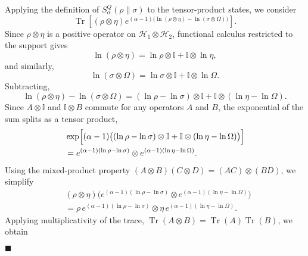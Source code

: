 \documentclass[a4paper, amsfonts, amssymb, amsmath, reprint, showkeys, nofootinbib, twoside, aps, pra]{revtex4-2}
\theoremstyle{definition}
\renewenvironment{proof}{\noindent{\bfseries Proof.}}{\hfill$\blacksquare$}
\begin{document}
\begin{proof}
Applying the definition of $S^Q_\alpha(\rho \| \sigma)$ to the tensor-product states, we consider
\begin{equation}
\operatorname{Tr}\!\left[
(\rho \otimes \eta)
e^{(\alpha-1)\bigl(\ln(\rho \otimes \eta)-\ln(\sigma \otimes \Omega)\bigr)}
\right].
\end{equation}
Since $\rho \otimes \eta$ is a positive operator on 
$\mathcal{H}_1 \otimes \mathcal{H}_2$, functional calculus restricted 
to the support gives
\begin{equation}
\ln(\rho \otimes \eta)
=
\ln\rho \otimes \mathbb{I}
+
\mathbb{I} \otimes \ln\eta,
\end{equation}
and similarly,
\begin{equation}
\ln(\sigma \otimes \Omega)
=
\ln\sigma \otimes \mathbb{I}
+
\mathbb{I} \otimes \ln\Omega.
\end{equation}
Subtracting,
\begin{equation}
\ln(\rho \otimes \eta)
-
\ln(\sigma \otimes \Omega)
=
(\ln\rho-\ln\sigma)\otimes \mathbb{I}
+
\mathbb{I}\otimes(\ln\eta-\ln\Omega).
\end{equation}
Since $A \otimes \mathbb{I}$ and $\mathbb{I} \otimes B$ commute for any 
operators $A$ and $B$, the exponential of the sum splits as a tensor product,
\begin{equation}
\begin{aligned}
&\exp\Bigl[ (\alpha-1)\bigl( (\ln\rho-\ln\sigma)\otimes \mathbb{I} + \mathbb{I}\otimes(\ln\eta-\ln\Omega) \bigr) \Bigr] \\
&= e^{(\alpha-1)(\ln\rho-\ln\sigma)} \otimes e^{(\alpha-1)(\ln\eta-\ln\Omega)}.
\end{aligned}
\end{equation}
Using the mixed-product property 
$(A \otimes B)(C \otimes D) = (AC) \otimes (BD)$,
we simplify
\begin{equation}
\begin{aligned}
&(\rho \otimes \eta) \bigl( e^{(\alpha-1)(\ln\rho-\ln\sigma)} \otimes e^{(\alpha-1)(\ln\eta-\ln\Omega)} \bigr) \\
&= \rho\,e^{(\alpha-1)(\ln\rho-\ln\sigma)} \otimes \eta\,e^{(\alpha-1)(\ln\eta-\ln\Omega)}.
\end{aligned}
\end{equation}
Applying multiplicativity of the trace, 
$\operatorname{Tr}(A \otimes B) = \operatorname{Tr}(A)\operatorname{Tr}(B)$,
we obtain
\begin{equation}
\begin{aligned}

\end{aligned}
\end{equation}
\end{proof}
\end{document}
